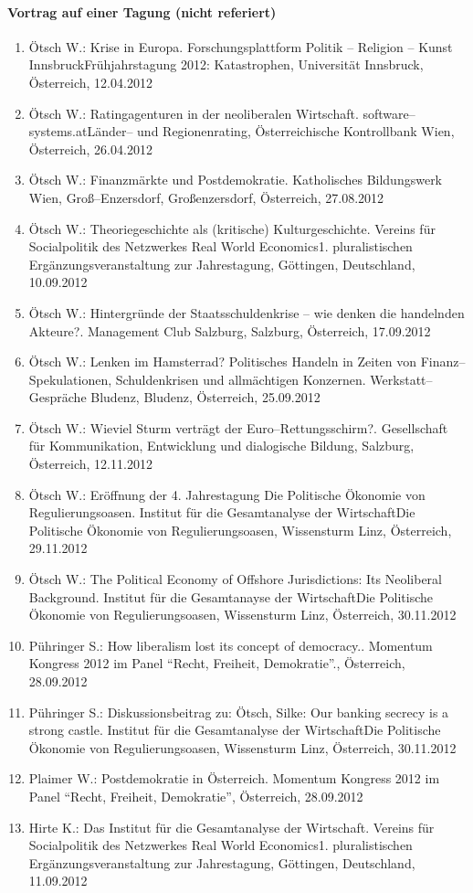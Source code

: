 \paragraph{Vortrag auf einer Tagung (nicht referiert)}
\begin{enumerate}
	\item Ötsch W.: Krise in Europa. Forschungsplattform Politik -- Religion -- Kunst InnsbruckFrühjahrstagung 2012: Katastrophen, Universität Innsbruck, Österreich, 12.04.2012
	\item Ötsch W.: Ratingagenturen in der neoliberalen Wirtschaft. software--systems.atLänder-- und Regionenrating, Österreichische Kontrollbank Wien, Österreich, 26.04.2012
	\item Ötsch W.: Finanzmärkte und Postdemokratie. Katholisches Bildungswerk Wien, Groß--Enzersdorf, Großenzersdorf, Österreich, 27.08.2012
	\item Ötsch W.: Theoriegeschichte als (kritische) Kulturgeschichte. Vereins für Socialpolitik des Netzwerkes Real World Economics1. pluralistischen Ergänzungsveranstaltung zur Jahrestagung, Göttingen, Deutschland, 10.09.2012
	\item Ötsch W.: Hintergründe der Staatsschuldenkrise – wie denken die handelnden Akteure?. Management Club Salzburg, Salzburg, Österreich, 17.09.2012
	\item Ötsch W.: Lenken im Hamsterrad? Politisches Handeln in Zeiten von Finanz--Spekulationen, Schuldenkrisen und allmächtigen Konzernen. Werkstatt--Gespräche Bludenz, Bludenz, Österreich, 25.09.2012
	\item Ötsch W.: Wieviel Sturm verträgt der Euro--Rettungsschirm?. Gesellschaft für Kommunikation, Entwicklung und dialogische Bildung, Salzburg, Österreich, 12.11.2012
	\item Ötsch W.: Eröffnung der 4. Jahrestagung Die Politische Ökonomie von Regulierungsoasen. Institut für die Gesamtanalyse der WirtschaftDie Politische Ökonomie von Regulierungsoasen, Wissensturm Linz, Österreich, 29.11.2012
	\item Ötsch W.: The Political Economy of Offshore Jurisdictions: Its Neoliberal Background. Institut für die Gesamtanayse der WirtschaftDie Politische Ökonomie von Regulierungsoasen, Wissensturm Linz, Österreich, 30.11.2012
	\item Pühringer S.: How liberalism lost its concept of democracy.. Momentum Kongress 2012 im Panel “Recht, Freiheit, Demokratie”., Österreich, 28.09.2012
	\item Pühringer S.: Diskussionsbeitrag zu: Ötsch, Silke: Our banking secrecy is a strong castle. Institut für die Gesamtanalyse der WirtschaftDie Politische Ökonomie von Regulierungsoasen, Wissensturm Linz, Österreich, 30.11.2012
	\item Plaimer W.: Postdemokratie in Österreich. Momentum Kongress 2012 im Panel “Recht, Freiheit, Demokratie”, Österreich, 28.09.2012
	\item Hirte K.: Das Institut für die Gesamtanalyse der Wirtschaft. Vereins für Socialpolitik des Netzwerkes Real World Economics1. pluralistischen Ergänzungsveranstaltung zur Jahrestagung, Göttingen, Deutschland, 11.09.2012
\end{enumerate}
